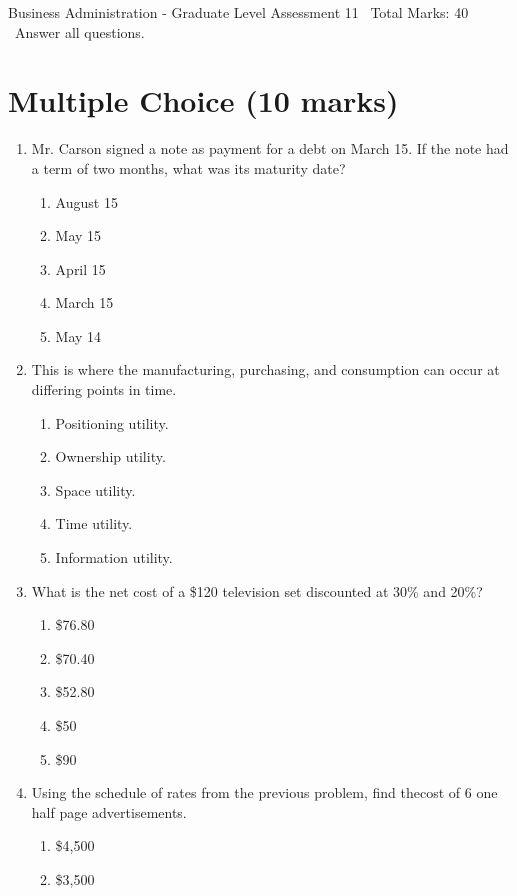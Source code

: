 \documentclass[12pt]{article}
\begin{document}
\begin{center}
Business Administration - Graduate Level Assessment 11 \
Total Marks: 40 \
Answer all questions.
\end{center}

\section*{Multiple Choice (10 marks)}
\begin{enumerate}[label=\arabic*.]
\item Mr. Carson signed a note as payment for a debt on March 15. If the note had a term of two months, what was its maturity date?
\begin{enumerate}[label=(\alph*)]
    \item August 15
    \item May 15
    \item April 15
    \item March 15
    \item May 14
\end{enumerate}
\item This is where the manufacturing, purchasing, and consumption can occur at differing points in time.
\begin{enumerate}[label=(\alph*)]
    \item Positioning utility.
    \item Ownership utility.
    \item Space utility.
    \item Time utility.
    \item Information utility.
\end{enumerate}
\item What is the net cost of a \$120 television set discounted at 30\% and 20\%?
\begin{enumerate}[label=(\alph*)]
    \item \$76.80
    \item \$70.40
    \item \$52.80
    \item \$50
    \item \$90
\end{enumerate}
\item Using the schedule of rates from the previous problem, find thecost of 6 one half page advertisements.
\begin{enumerate}[label=(\alph*)]
    \item \$4,500
    \item \$3,500

\end{enumerate}
\end{enumerate}
\end{document}
